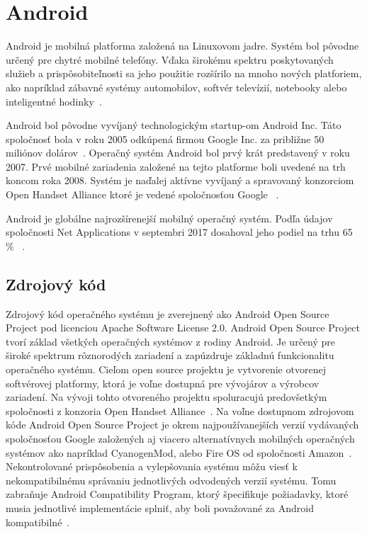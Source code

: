 \chapter{Android}
Android je mobilná platforma založená na Linuxovom jadre. Systém bol pôvodne určený pre chytré mobilné telefóny. Vďaka širokému spektru poskytovaných služieb a prispôsobiteľnosti sa jeho použitie rozšírilo na mnoho nových platforiem, ako napríklad zábavné systémy automobilov, softvér televízií, notebooky alebo inteligentné hodinky~\cite{AndroidAbout}. 

Android bol pôvodne vyvíjaný technologickým startup-om Android Inc. Táto spoločnosť bola v roku 2005 odkúpená firmou Google Inc. za približne 50 miliónov dolárov~\cite{Rosoff2011}. Operačný systém Android bol prvý krát predstavený v roku 2007. Prvé mobilné zariadenia založené na tejto platforme boli uvedené na trh koncom roka 2008. Systém je naďalej aktívne vyvíjaný a spravovaný konzorciom Open Handset Alliance ktoré je vedené spoločnosťou Google ~\cite{OHA}.

Android je globálne najrozšírenejší mobilný operačný systém. Podľa údajov spoločnosti Net Applications v septembri 2017 dosahoval jeho podiel na trhu 65 \% ~\cite{NetMarketShare}.

\section{Zdrojový kód}
Zdrojový kód operačného systému je zverejnený ako Android Open Source Project pod licenciou Apache Software License 2.0. Android Open Source Project tvorí základ všetkých operačných systémov z rodiny Android. Je určený pre široké spektrum rôznorodých zariadení a zapúzdruje základnú funkcionalitu operačného systému. Cieľom open source projektu je vytvorenie otvorenej softvérovej platformy, ktorá je voľne dostupná pre vývojárov a výrobcov zariadení. Na vývoji tohto otvoreného projektu spoluracujú predovšetkým spoločnosti z konzoria Open Handset Alliance~\cite{AndroidSource}.
Na voľne dostupnom zdrojovom kóde Android Open Source Project je okrem najpoužívanejších verzií vydávaných spoločnosťou Google založených aj viacero alternatívnych mobilných operačných systémov ako napríklad CyanogenMod, alebo Fire OS od spoločnosti Amazon~\cite{AndroidOpen}.
Nekontrolované prispôsobenia a vylepšovania systému môžu viesť k nekompatibilnému správaniu jednotlivých odvodených verzií systému. Tomu zabraňuje Android Compatibility Program, ktorý špecifikuje požiadavky, ktoré musia jednotlivé implementácie splniť, aby boli považované za Android kompatibilné~\cite{AndroidCompatibility}. 



